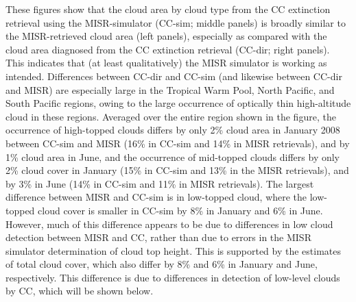 These figures show that the cloud area by cloud type from the CC
extinction retrieval using the MISR-simulator (CC-sim; middle panels) is
broadly similar to the MISR-retrieved cloud area (left panels),
especially as compared with the cloud area diagnosed from the CC
extinction retrieval (CC-dir; right panels). This indicates that (at
least qualitatively) the MISR simulator is working as intended.
Differences between CC-dir and CC-sim (and likewise between CC-dir and
MISR) are especially large in the Tropical Warm Pool, North Pacific, and
South Pacific regions, owing to the large occurrence of optically thin
high-altitude cloud in these regions. Averaged over the entire region
shown in the figure, the occurrence of high-topped clouds differs by
only 2\% cloud area in January 2008 between CC-sim and MISR (16\% in
CC-sim and 14\% in MISR retrievals), and by 1\% cloud area in June, and
the occurrence of mid-topped clouds differs by only 2\% cloud cover in
January (15\% in CC-sim and 13\% in the MISR retrievals), and by 3\% in
June (14\% in CC-sim and 11\% in MISR retrievals). The largest
difference between MISR and CC-sim is in low-topped cloud, where the
low-topped cloud cover is smaller in CC-sim by 8\% in January and 6\% in
June. However, much of this difference appears to be due to differences
in low cloud detection between MISR and CC, rather than due to errors in
the MISR simulator determination of cloud top height. This is supported
by the estimates of total cloud cover, which also differ by 8\% and 6\%
in January and June, respectively. This difference is due to differences
in detection of low-level clouds by CC, which will be shown below.

